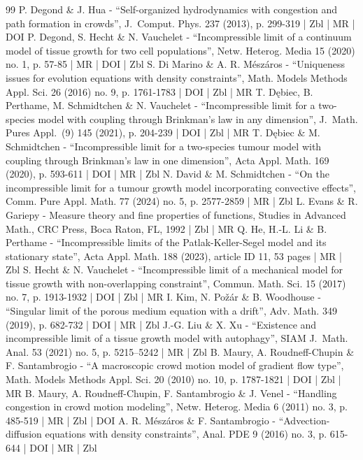 \documentclass[10pt]{amsart}
\theoremstyle{plain}
\theoremstyle{remark}
\begin{document}
\begin{thebibliography}{99}
P. Degond \& J. Hua - “Self-organized hydrodynamics with congestion and path formation in crowds”, J. Comput. Phys. 237 (2013), p. 299-319 | Zbl | MR | DOI
P. Degond, S. Hecht \& N. Vauchelet - “Incompressible limit of a continuum model of tissue growth for two cell populations”, Netw. Heterog. Media 15 (2020) no. 1, p. 57-85 | MR | DOI | Zbl
S. Di Marino \& A. R. Mészáros - “Uniqueness issues for evolution equations with density constraints”, Math. Models Methods Appl. Sci. 26 (2016) no. 9, p. 1761-1783 | DOI | Zbl | MR
T. Dębiec, B. Perthame, M. Schmidtchen \& N. Vauchelet - “Incompressible limit for a two-species model with coupling through Brinkman’s law in any dimension”, J. Math. Pures Appl. (9) 145 (2021), p. 204-239 | DOI | Zbl | MR
T. Dębiec \& M. Schmidtchen - “Incompressible limit for a two-species tumour model with coupling through Brinkman’s law in one dimension”, Acta Appl. Math. 169 (2020), p. 593-611 | DOI | MR | Zbl
N. David \& M. Schmidtchen - “On the incompressible limit for a tumour growth model incorporating convective effects”, Comm. Pure Appl. Math. 77 (2024) no. 5, p. 2577-2859 | MR | Zbl
L. Evans \& R. Gariepy - Measure theory and fine properties of functions, Studies in Advanced Math., CRC Press, Boca Raton, FL, 1992 | Zbl | MR
Q. He, H.-L. Li \& B. Perthame - “Incompressible limits of the Patlak-Keller-Segel model and its stationary state”, Acta Appl. Math. 188 (2023), article ID 11, 53 pages | MR | Zbl
S. Hecht \& N. Vauchelet - “Incompressible limit of a mechanical model for tissue growth with non-overlapping constraint”, Commun. Math. Sci. 15 (2017) no. 7, p. 1913-1932 | DOI | Zbl | MR
I. Kim, N. Požár \& B. Woodhouse - “Singular limit of the porous medium equation with a drift”, Adv. Math. 349 (2019), p. 682-732 | DOI | MR | Zbl
J.-G. Liu \& X. Xu - “Existence and incompressible limit of a tissue growth model with autophagy”, SIAM J. Math. Anal. 53 (2021) no. 5, p. 5215–5242 | MR | Zbl
B. Maury, A. Roudneff-Chupin \& F. Santambrogio - “A macroscopic crowd motion model of gradient flow type”, Math. Models Methods Appl. Sci. 20 (2010) no. 10, p. 1787-1821 | DOI | Zbl | MR
B. Maury, A. Roudneff-Chupin, F. Santambrogio \& J. Venel - “Handling congestion in crowd motion modeling”, Netw. Heterog. Media 6 (2011) no. 3, p. 485-519 | MR | Zbl | DOI
A. R. Mészáros \& F. Santambrogio - “Advection-diffusion equations with density constraints”, Anal. PDE 9 (2016) no. 3, p. 615-644 | DOI | MR | Zbl

\end{thebibliography}
\end{document}
